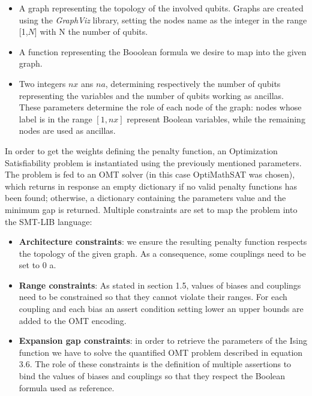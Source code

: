 \begin{itemize}
    \item A graph representing the topology of the involved qubits. Graphs are created using the \textit{GraphViz} library, setting the nodes name as the integer in the range [1,$N$] with N the number of qubits. 
    \item A function representing the Booolean formula we desire to map into the given graph.
    \item Two integers $nx$ ans $na$, determining respectively the number of qubits representing the variables and the number of qubits working as ancillas. These parameters determine the role of each node of the graph: nodes whose label is in the range $[1, nx]$ represent Boolean variables, while the remaining nodes are used as ancillas.
\end{itemize}

In order to get the weights defining the penalty function, an Optimization Satisfiability problem is instantiated using the previously mentioned parameters. The problem is fed to an OMT solver (in this case OptiMathSAT was chosen), which returns in response an empty dictionary if no valid penalty functions has been found; otherwise, a dictionary containing the parameters value and the minimum gap is returned. Multiple constraints are set to map the problem into the SMT-LIB language:
 
\begin{itemize}
    \item \textbf{Architecture constraints}: we ensure the resulting penalty function respects the topology of the given graph. As a consequence, some couplings need to be set to 0 a.
    \item \textbf{Range constraints}: As stated in section 1.5, values of biases and couplings need to be constrained so that they cannot violate their ranges. For each coupling and each bias an assert condition setting lower an upper bounds are added to the OMT encoding.
    \item \textbf{Expansion gap constraints}: in order to retrieve the parameters of the Ising function we have to solve the  quantified OMT problem described in equation 3.6. The role of these constraints is the definition of multiple assertions to bind the values of biases and couplings so that they respect the Boolean formula used as reference.
\end{itemize}

